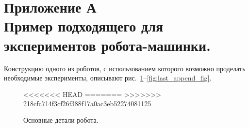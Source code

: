 \documentclass[12pt,a4paper,openany]{extarticle}
\begin{document}
\section*{Приложение А\\
Пример подходящего для экспериментов робота-машинки.}
\hspace*{\parindent}Конструкцию одного из роботов, с использованием которого возможно проделать необходимые эксперименты, описывают рис.~\ref{fig:first_append_fig}--\ref{fig:last_append_fig}.
\vspace{1cm}
\begin{figure}[h!]
<<<<<<< HEAD
=======
>>>>>>> 218cfc714f3cf26f388f17a0ac3eb52274081125
	\vspace{-0.5cm}
	\caption{Основные детали робота.}
	\label{fig:first_append_fig}
\end{figure}	
\end{document}

